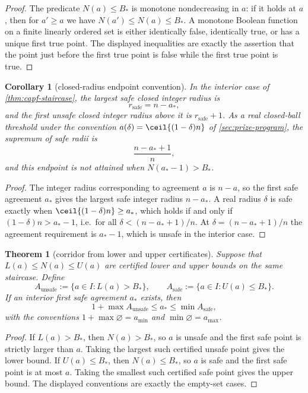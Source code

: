 \documentclass[11pt]{article}
\newtheorem{theorem}{Theorem}[section]
\newtheorem{corollary}[corollary]{Corollary}
\theoremstyle{definition}
\theoremstyle{remark}
\begin{document}
\begin{proof}
The predicate $N(a)\le B_*$ is monotone nondecreasing in $a$: if it holds at $a$, then for $a'\ge a$ we have $N(a')\le N(a)\le B_*$.  A monotone Boolean function on a finite linearly ordered set is either identically false, identically true, or has a unique first true point.  The displayed inequalities are exactly the assertion that the point just before the first true point is false while the first true point is true.
\end{proof}

\begin{corollary}[closed-radius endpoint convention]\label{cor:capf-endpoint}
In the interior case of \cref{thm:capf-staircase}, the largest safe closed integer radius is
\[
        r_{\mathrm{safe}}=n-a_*,
\]
and the first unsafe closed integer radius above it is $r_{\mathrm{safe}}+1$.  As a real closed-ball threshold under the convention $a(\delta)=\ceil{(1-\delta)n}$ of \cref{sec:prize-program}, the supremum of safe radii is
\[
        \frac{n-a_*+1}{n},
\]
and this endpoint is not attained when $N(a_*-1)>B_*$.
\end{corollary}

\begin{proof}
The integer radius corresponding to agreement $a$ is $n-a$, so the first safe agreement $a_*$ gives the largest safe integer radius $n-a_*$.  A real radius $\delta$ is safe exactly when $\ceil{(1-\delta)n}\ge a_*$, which holds if and only if $(1-\delta)n>a_*-1$, i.e.\ for all $\delta<(n-a_*+1)/n$.  At $\delta=(n-a_*+1)/n$ the agreement requirement is $a_*-1$, which is unsafe in the interior case.
\end{proof}

\begin{theorem}[corridor from lower and upper certificates]\label{thm:capf-corridor}
Suppose that $L(a)\le N(a)\le U(a)$ are certified lower and upper bounds on the same staircase.  Define
\[
        A_{\mathrm{unsafe}}:=\{a\in I:L(a)>B_*\},
        \qquad
        A_{\mathrm{safe}}:=\{a\in I:U(a)\le B_*\}.
\]
If an interior first safe agreement $a_*$ exists, then
\[
        1+\max A_{\mathrm{unsafe}}\le a_*\le \min A_{\mathrm{safe}},
\]
with the conventions $1+\max\varnothing=a_{\min}$ and $\min\varnothing=a_{\max}$.
\end{theorem}

\begin{proof}
If $L(a)>B_*$, then $N(a)>B_*$, so $a$ is unsafe and the first safe point is strictly larger than $a$.  Taking the largest such certified unsafe point gives the lower bound.  If $U(a)\le B_*$, then $N(a)\le B_*$, so $a$ is safe and the first safe point is at most $a$.  Taking the smallest such certified safe point gives the upper bound.  The displayed conventions are exactly the empty-set cases.
\end{proof}
\end{document}
